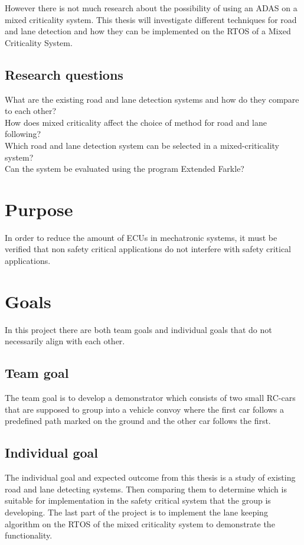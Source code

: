 However there is not much research about the possibility of using an ADAS on a mixed criticality system. This thesis will investigate different techniques for road and lane detection and how they can be implemented on the RTOS of a Mixed Criticality System.


\subsection{Research questions}
What are the existing road and lane detection systems and how do they compare to each other?\\

How does mixed criticality affect the choice of method for road and lane following?\\

Which road and lane detection system can be selected in a mixed-criticality system?\\

Can the system be evaluated using the program Extended Farkle?

\section{Purpose}
In order to reduce the amount of ECUs in mechatronic systems, it must be verified that non safety critical applications do not interfere with safety critical applications.

\section{Goals}
In this project there are both team goals and individual goals that do not necessarily align with each other.

\subsection{Team goal}
The team goal is to develop a demonstrator which consists of two small RC-cars that are supposed to group into a vehicle convoy where the first car follows a predefined path marked on the ground and the other car follows the first.

\subsection{Individual goal}
The individual goal and expected outcome from this thesis is a study of existing road and lane detecting systems. Then comparing them to determine which is suitable for implementation in the safety critical system that the group is developing. The last part of the project is to implement the lane keeping algorithm on the RTOS of the mixed criticality system to demonstrate the functionality.

